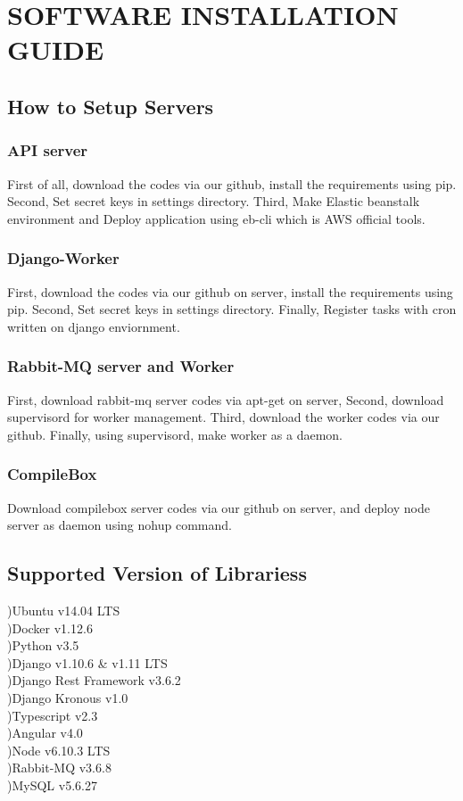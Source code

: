 \documentclass[10pt,journal,compsoc]{IEEEtran}
\begin{document}
\section{SOFTWARE INSTALLATION GUIDE}
\label{sec:SOFTWARE INSTALLATION GUIDE}
\fi

\subsection{How to Setup Servers}
\subsubsection{API server}
First of all, download the codes via our github, install the requirements using pip. Second, Set secret keys in settings directory. Third, Make Elastic beanstalk environment and Deploy application using eb-cli which is AWS official tools.
\subsubsection{Django-Worker}
First, download the codes via our github on server, install the requirements using pip. Second, Set secret keys in settings directory. Finally, Register tasks with cron written on django enviornment.
\subsubsection{Rabbit-MQ server and Worker}
First, download rabbit-mq server codes via apt-get on server, Second, download supervisord for worker management. Third, download the worker codes via our github. Finally, using supervisord, make worker as a daemon.
\subsubsection{CompileBox}
Download compilebox server codes via our github on server, and deploy node server as daemon using nohup command.
\subsection{Supported Version of Librariess}
)Ubuntu v14.04 LTS\\
\null{})Docker v1.12.6\\
\null{})Python v3.5\\
\null{})Django v1.10.6 \& v1.11 LTS\\
\null{})Django Rest Framework v3.6.2\\
\null{})Django Kronous v1.0\\
\null{})Typescript v2.3\\
\null{})Angular v4.0\\ 
\null{})Node v6.10.3 LTS\\
\null{})Rabbit-MQ v3.6.8\\
\null{})MySQL v5.6.27\\\\
\bigskip
\bigskip
\end{document}
